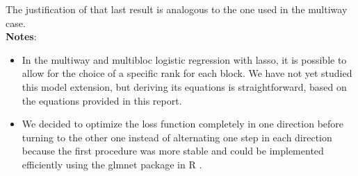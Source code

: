\documentclass[10pt]{article}
\begin{document}
\noindent The justification of that last result is analogous to the one used in the multiway case.\\[2 pt]

\noindent \textbf{Notes}:
\begin{itemize}
    \item In the multiway and multibloc logistic regression with lasso, it is possible to allow for the choice of a specific rank for each block. We have not yet studied this model extension, but deriving its equations is straightforward, based on the equations provided in this report.
    \item We decided to optimize the loss function completely in one direction before turning to the other one instead of alternating one step in each direction because the first procedure was more stable and could be implemented efficiently using the glmnet package in R \cite{glmnet}.
\end{itemize}

\vspace{7 pt}
\end{document}
